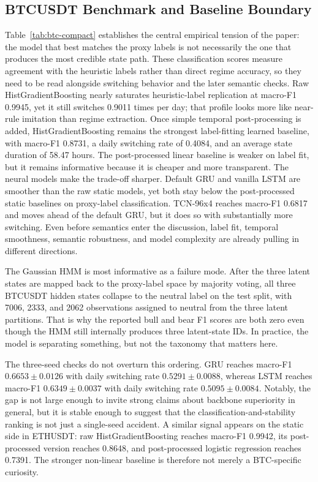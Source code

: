 \documentclass[a4paper,fleqn]{cas-dc}
\begin{document}
\subsection{BTCUSDT Benchmark and Baseline Boundary}
Table~\ref{tab:btc-compact} establishes the central empirical tension of the paper: the model that best matches the proxy labels is not necessarily the one that produces the most credible state path. These classification scores measure agreement with the heuristic labels rather than direct regime accuracy, so they need to be read alongside switching behavior and the later semantic checks. Raw HistGradientBoosting nearly saturates heuristic-label replication at macro-F1 0.9945, yet it still switches 0.9011 times per day; that profile looks more like near-rule imitation than regime extraction. Once simple temporal post-processing is added, HistGradientBoosting remains the strongest label-fitting learned baseline, with macro-F1 0.8731, a daily switching rate of 0.4084, and an average state duration of 58.47 hours. The post-processed linear baseline is weaker on label fit, but it remains informative because it is cheaper and more transparent. The neural models make the trade-off sharper. Default GRU and vanilla LSTM are smoother than the raw static models, yet both stay below the post-processed static baselines on proxy-label classification. TCN-96x4 reaches macro-F1 0.6817 and moves ahead of the default GRU, but it does so with substantially more switching. Even before semantics enter the discussion, label fit, temporal smoothness, semantic robustness, and model complexity are already pulling in different directions.

The Gaussian HMM is most informative as a failure mode. After the three latent states are mapped back to the proxy-label space by majority voting, all three BTCUSDT hidden states collapse to the neutral label on the test split, with 7006, 2333, and 2062 observations assigned to neutral from the three latent partitions. That is why the reported bull and bear F1 scores are both zero even though the HMM still internally produces three latent-state IDs. In practice, the model is separating something, but not the taxonomy that matters here.

The three-seed checks do not overturn this ordering. GRU reaches macro-F1 $0.6653 \pm 0.0126$ with daily switching rate $0.5291 \pm 0.0088$, whereas LSTM reaches macro-F1 $0.6349 \pm 0.0037$ with daily switching rate $0.5095 \pm 0.0084$. Notably, the gap is not large enough to invite strong claims about backbone superiority in general, but it is stable enough to suggest that the classification-and-stability ranking is not just a single-seed accident. A similar signal appears on the static side in ETHUSDT: raw HistGradientBoosting reaches macro-F1 0.9942, its post-processed version reaches 0.8648, and post-processed logistic regression reaches 0.7391. The stronger non-linear baseline is therefore not merely a BTC-specific curiosity.
\end{document}
